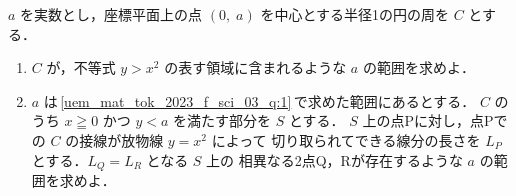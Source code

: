 ﻿\documentclass[../../../uem_mat_tok_q.tex]{subfiles}
\begin{document}
    $a$ を実数とし，座標平面上の点 $(0,\;a)$ を中心とする半径1の円の周を $C$ とする．

    \begin{enumerate}
        \item $C$ が，不等式 $y>x^2$ の表す領域に含まれるような $a$ の範囲を求めよ．
            \label{uem_mat_tok_2023_f_sci_03_q:1}
        \item $a$ は\,\ref{uem_mat_tok_2023_f_sci_03_q:1}\,で求めた範囲にあるとする．%
            $C$ のうち $x\geqq 0$ かつ $y<a$ を満たす部分を $S$ とする．%
            $S$ 上の点Pに対し，点Pでの $C$ の接線が放物線 $y=x^2$ によって%
            切り取られてできる線分の長さを $L_P$ とする．$L_Q=L_R$ となる $S$ 上の%
            相異なる2点Q，Rが存在するような $a$ の範囲を求めよ．
    \end{enumerate}
\end{document}

